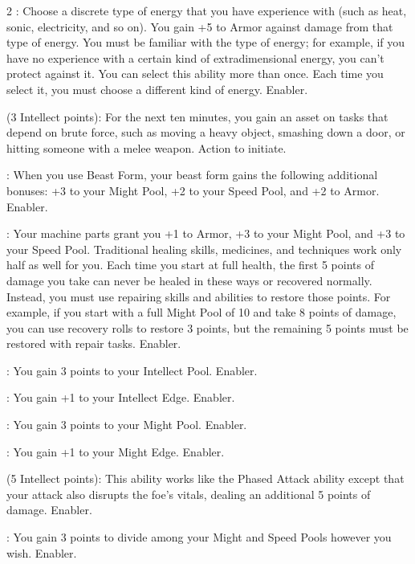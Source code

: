 \begin{multicols}{2}
: Choose a discrete type of energy that you have experience with (such as heat, sonic, electricity, and so on). You gain +5 to Armor against damage from that type of energy. You must be familiar with the type of energy; for example, if you have no experience with a certain kind of extradimensional energy, you can’t protect against it. You can select this ability more than once. Each time you select it, you must choose a different kind of energy. Enabler. 
 
 (3 Intellect points): For the next ten minutes, you gain an asset on tasks that depend on brute force, such as moving a heavy object, smashing down a door, or hitting someone with a melee weapon. Action to initiate. 
 
: When you use Beast Form, your beast form gains the following additional bonuses: +3 to your Might Pool, +2 to your Speed Pool, and +2 to Armor. Enabler. 
 
: Your machine parts grant you +1 to Armor, +3 to your Might Pool, and +3 to your Speed Pool. Traditional healing skills, medicines, and techniques work only half as well for you. Each time you start at full health, the first 5 points of damage you take can never be healed in these ways or recovered normally. Instead, you must use repairing skills and abilities to restore those points. For example, if you start with a full Might Pool of 10 and take 8 points of damage, you can use recovery rolls to restore 3 points, but the remaining 5 points must be restored with repair tasks. Enabler.
 
: You gain 3 points to your Intellect Pool. Enabler.

: You gain +1 to your Intellect Edge. Enabler. 
 
: You gain 3 points to your Might Pool. Enabler. 

: You gain +1 to your Might Edge. Enabler. 
 
 (5 Intellect points): This ability works like the Phased Attack ability except that your attack also disrupts the foe’s vitals, dealing an additional 5 points of damage. Enabler. 
 
: You gain 3 points to divide among your Might and Speed Pools however you wish. Enabler. 
 

\end{multicols}
